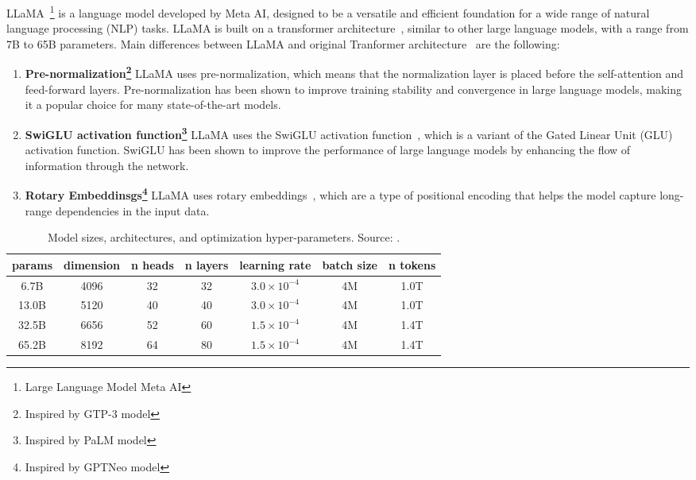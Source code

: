 LLaMA~\footnote{Large Language Model Meta AI} is a language model developed by Meta AI, designed to be a versatile and efficient foundation for a wide range of natural language processing (NLP) tasks.
LLaMA is built on a transformer architecture~\cite{vaswani2023attention}, similar to other large language models, with a range from 7B to 65B parameters.
Main differences between LLaMA and original Tranformer architecture~\cite{vaswani2023attention} are the following:
\begin{enumerate}
    \item \textbf{Pre-normalization\footnote{Inspired by GTP-3 model}} {LLaMA uses pre-normalization, which means that the normalization layer is placed before the self-attention and feed-forward layers.
    Pre-normalization has been shown to improve training stability and convergence in large language models, making it a popular choice for many state-of-the-art models.
    }
    \item \textbf{SwiGLU activation function\footnote{Inspired by PaLM model}} {LLaMA uses the SwiGLU activation function~\cite{shazeer2020glu}, which is a variant of the Gated Linear Unit (GLU) activation function.
    SwiGLU has been shown to improve the performance of large language models by enhancing the flow of information through the network.
    }
    \item \textbf{Rotary Embeddinsgs\footnote{Inspired by GPTNeo model}} {LLaMA uses rotary embeddings~\cite{su2021roformer}, which are a type of positional encoding that helps the model capture long-range dependencies in the input data.
    }
\end{enumerate}

\begin{table}[ht]
    \centering
    \caption{Model sizes, architectures, and optimization hyper-parameters. Source: \protect\cite{touvron2023llama}. }
    \label{tab:llama-model-params}
    \begin{tabular}{@{}ccccccc@{}}
        \toprule
        params & dimension & n heads & n layers & learning rate          & batch size & n tokens \\
        \midrule
        6.7B     & 4096      & 32      & 32       & \(3.0 \times 10^{-4}\) & 4M         & 1.0T     \\
        13.0B    & 5120      & 40      & 40       & \(3.0 \times 10^{-4}\) & 4M         & 1.0T     \\
        32.5B    & 6656      & 52      & 60       & \(1.5 \times 10^{-4}\) & 4M         & 1.4T     \\
        65.2B    & 8192      & 64      & 80       & \(1.5 \times 10^{-4}\) & 4M         & 1.4T     \\
        \bottomrule
    \end{tabular}
\end{table}

